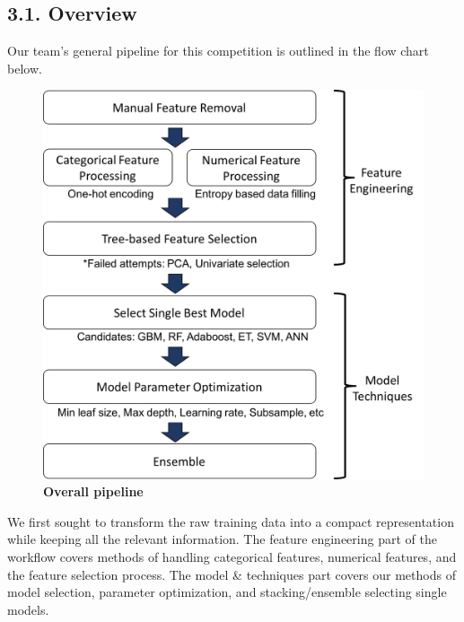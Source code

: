 \subsection*{3.1. Overview}
Our team's general pipeline for this competition is outlined in the flow chart below. \\
\begin{figure}[h]
\center
\includegraphics[scale=0.4]{figure1/figure1.png}
\caption{\textbf{Overall pipeline}}
\end{figure}

We first sought to transform the raw training data into a compact representation while keeping all the relevant information. The feature engineering part of the workflow covers methods of handling categorical features, numerical features, and the feature selection process. The model \& techniques part covers our methods of model selection, parameter
optimization, and stacking/ensemble selecting single models.

